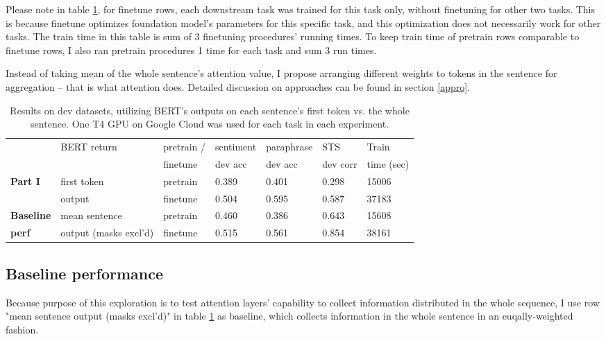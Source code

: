 \documentclass{article}
\begin{document}
Please note in table \ref{exp_perf}, for finetune rows, each downstream task was trained for this task only, without finetuning for other two tasks. This is because finetune optimizes foundation model's parameters for this specific task, and this optimization does not necessarily work for other tasks. The train time in this table is sum of 3 finetuning procedures' running times. To keep train time of pretrain rows comparable to finetune rows, I also ran pretrain procedures 1 time for each task and sum 3 run times.

Instead of taking mean of the whole sentence's attention value, I propose arranging different weights to tokens in the sentence for aggregation -- that is what attention does. Detailed discussion on approaches can be found in section \ref{appro}.

\begin{table}
\begin{center}
\label{exp_perf}
    \hspace*{0cm}\begin{tabular}{| l | l | l | l | l | l | l |} \hline
                      & BERT return    & pretrain /  & sentiment  & paraphrase  & STS      & Train\\
                      &                & finetune    & dev acc    & dev acc     & dev corr & time (sec) \\ \hline\hline
    \textbf{Part I}   & first token    & pretrain    & 0.389      & 0.401       & 0.298    & 15006\\ \cline{3-7}
                      & output         & finetune    & 0.504      & 0.595       & 0.587    & 37183\\ \hline \hline
    \textbf{Baseline} & mean sentence  & pretrain    & 0.460      & 0.386       & 0.643    & 15608\\ \cline{3-7}
    \textbf{perf}     & output (masks excl'd) & finetune    & 0.515      & 0.561       & 0.854 & 38161    \\ \hline 
    \end{tabular}\newline
\caption{Results on dev datasets, utilizing BERT's outputs on each sentence's first token vs. the whole sentence. One T4 GPU on Google Cloud was used for each task in each experiment.}
\end{center}
\end{table}





\subsection{Baseline performance}
\label{baseline}
Because purpose of this exploration is to test attention layers' capability to collect information distributed in the whole sequence, I use row "mean sentence output (masks excl'd)" in table \ref{exp_perf} as baseline, which collects information in the whole sentence in an euqally-weighted fashion.
\end{document}
